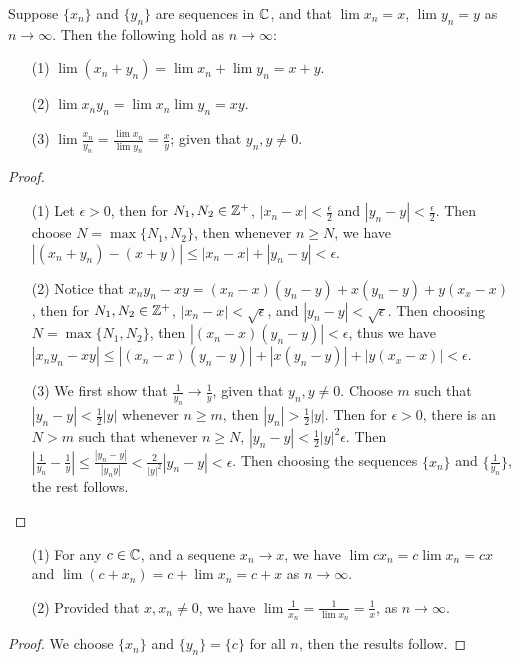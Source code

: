 \begin{theorem}\label{theorem_3.1.2}
  Suppose $\{x_n\}$ and  $\{y_n\}$ are sequences in  $\mathbb{C}$, and that  $\lim{x_n}=x$,
  $\lim{y_n}=y$ as  $n \rightarrow \infty$. Then the following hold as
  $n \rightarrow \infty$:
  \begin{enumerate}
    \item[(1)] $\lim{(x_n+y_n)}=\lim{x_n}+\lim{y_n}=x+y$.

    \item[(2)] $\lim{x_ny_n}=\lim{x_n}\lim{y_n}=xy$.

    \item[(3)] $\lim{\frac{x_n}{y_n}}=\frac{\lim{x_n}}{\lim{y_n}}=\frac{x}{y}$;
      given that $y_n, y \neq 0$.
  \end{enumerate}
\end{theorem}
\begin{proof}
  \begin{enumerate}
    \item[(1)] Let $\epsilon>0$, then for  $N_1, N_2 \in \mathbb{Z}^+$,
      $|x_n-x|<\frac{\epsilon}{2}$ and
      $|y_n-y|<\frac{\epsilon}{2}$. Then choose $N=\max\{N_1,N_2\}$, then
      whenever $n \geq N$, we have  $|(x_n+y_n)-(x+y)| \leq
      |x_n-x|+|y_n-y|<\epsilon$.

    \item[(2)] Notice that $x_ny_n-xy=(x_n-x)(y_n-y)+x(y_n-y)+y(x_x-x)$, then for
      $N_1,N_2 \in \mathbb{Z}^+$, $|x_n-x|<\sqrt{\epsilon}$, and  $|y_n-y|<\sqrt{\epsilon}$.
      Then choosing  $N=\max\{N_1,N_2\}$, then $|(x_n-x)(y_n-y)|<\epsilon$, thus
      we have $|x_ny_n-xy|\leq |(x_n-x)(y_n-y)|+|x(y_n-y)|+|y(x_x-x)|<\epsilon$.

    \item[(3)] We first show that $\frac{1}{y_n} \rightarrow \frac{1}{y}$, given
      that $y_n,y \neq 0$. Choose  $m$ such that  $|y_n-y|<\frac{1}{2}|y|$
      whenever $n \geq m$, then $|y_n|>\frac{1}{2}|y|$. Then for $\epsilon>0$,
      there is an  $N>m$ such that whenever  $n \geq N$,
      $|y_n-y|<\frac{1}{2}|y|^2\epsilon$. Then $|\frac{1}{y_n}-\frac{1}{y}| \leq
      \frac{|y_n-y|}{|y_ny|}<\frac{2}{|y|^2}|y_n-y|<\epsilon$. Then choosing the
      sequences $\{x_n\}$ and  $\{\frac{1}{y_n}\}$, the rest follows.
  \end{enumerate}
\end{proof}
\begin{corollary}
  \begin{enumerate}
    \item[(1)] For any $c \in \mathbb{C}$, and a sequene  $x_n \rightarrow x$, we have
      $\lim{cx_n}=c\lim{x_n}=cx$ and  $\lim{(c+x_n)}=c+\lim{x_n}=c+x$ as
      $n \rightarrow \infty$.

    \item[(2)] Provided that  $x,x_n \neq 0$, we have
      $\lim{\frac{1}{x_n}}=\frac{1}{\lim{x_n}}=\frac{1}{x}$, as
      $n \rightarrow \infty$.
  \end{enumerate}
\end{corollary}
\begin{proof}
  We choose $\{x_n\}$ and  $\{y_n\}=\{c\}$ for all  $n$, then the results follow.
\end{proof}

